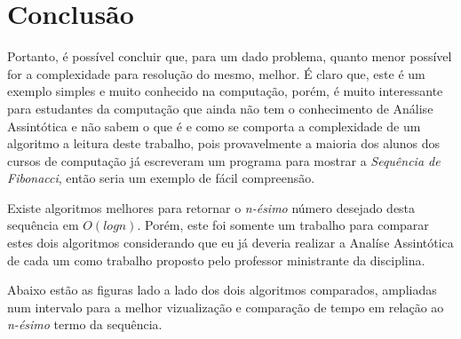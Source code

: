 \documentclass[a4paper, 12pt]{article}
\begin{document}
\section{Conclusão}

Portanto, é possível concluir que, para um dado problema, quanto menor possível for a complexidade para resolução do mesmo, melhor. É claro que, este é um exemplo simples e muito conhecido na computação, porém, é muito interessante para estudantes da computação que ainda não tem o conhecimento de Análise Assintótica e não sabem o que é e como se comporta a complexidade de um algoritmo a leitura deste trabalho, pois provavelmente a maioria dos alunos dos cursos de computação já escreveram um programa para mostrar a {\it Sequência de Fibonacci}, então seria um exemplo de fácil compreensão.

Existe algoritmos melhores para retornar o {\it n-ésimo} número desejado desta sequência em $O(logn)$. Porém, este foi somente um trabalho para comparar estes dois algoritmos considerando que eu já deveria realizar a Analíse Assintótica de cada um como trabalho proposto pelo professor ministrante da disciplina. 

Abaixo estão as figuras lado a lado dos dois algoritmos comparados, ampliadas num intervalo para a melhor vizualização e comparação de tempo em relação ao {\it n-ésimo} termo da sequência.
\end{document}

